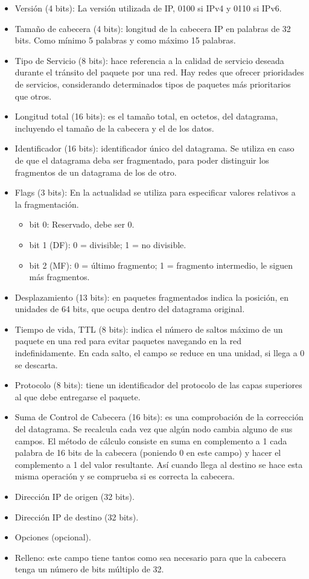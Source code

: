 \begin{itemize}
    \item Versión (4 bits): La versión utilizada de \acrshort{IP}, 0100 si \acrshort{IPv4} y 0110 si \acrshort{IPv6}. 
    \item Tamaño de cabecera (4 bits): longitud de la cabecera IP en palabras de 32 bits. Como mínimo 5 palabras y como máximo 15 palabras.
    \item Tipo de Servicio (8 bits): hace referencia a la calidad de servicio deseada durante el tránsito del paquete por una red. Hay redes que ofrecer prioridades de servicios, considerando determinados tipos de paquetes más prioritarios que otros.
    \item Longitud total (16 bits): es el tamaño total, en octetos, del datagrama, incluyendo el tamaño de la cabecera y el de los datos.
    \item Identificador (16 bits): identificador único del datagrama. Se utiliza en caso de que el datagrama deba ser fragmentado, para poder distinguir los fragmentos de un datagrama de los de otro.
    \item Flags (3 bits): En la actualidad se utiliza para especificar valores relativos a la fragmentación.
        \begin{itemize}
            \item bit 0: Reservado, debe ser 0.
            \item bit 1 (DF): 0 = divisible; 1 = no divisible.
            \item bit 2 (MF): 0 = último fragmento; 1 = fragmento intermedio, le siguen más fragmentos. 
        \end{itemize}
    \item Desplazamiento (13 bits): en paquetes fragmentados indica la posición, en unidades de 64 bits, que ocupa dentro del datagrama original. 
    \item Tiempo de vida, \acrshort{TTL} (8 bits): indica el número de saltos máximo de un paquete en una red para evitar paquetes navegando en la red indefinidamente. En cada salto, el campo se reduce en una unidad, si llega a 0 se descarta.
    \item Protocolo (8 bits): tiene un identificador del protocolo de las capas superiores al que debe entregarse el paquete.
    \item Suma de Control de Cabecera (16 bits): es una comprobación de la corrección del datagrama. Se recalcula cada vez que algún nodo cambia alguno de sus campos. El método de cálculo consiste en suma en complemento a 1 cada palabra de 16 bits de la cabecera (poniendo 0 en este campo) y hacer el complemento a 1 del valor resultante. Así cuando llega al destino se hace esta misma operación y se comprueba si es correcta la cabecera.
    \item Dirección IP de origen (32 bits).
    \item Dirección IP de destino (32 bits).
    \item Opciones (opcional).
    \item Relleno: este campo tiene tantos como sea necesario para que la cabecera tenga un número de bits múltiplo de 32. 
\end{itemize}

